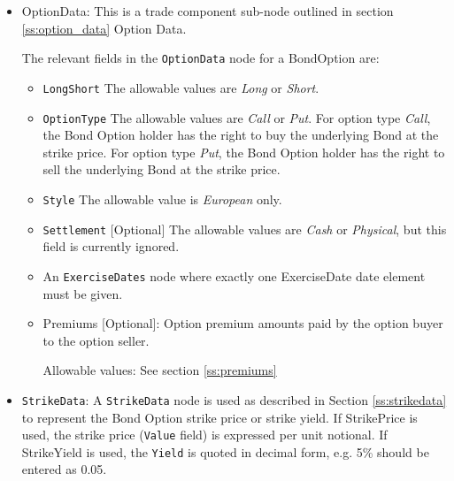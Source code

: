 \begin{itemize}
    \item OptionData: This is a trade component sub-node outlined in section \ref{ss:option_data} Option Data. 
    
The relevant fields in the \lstinline!OptionData! node for a BondOption are:

\begin{itemize}
\item \lstinline!LongShort! The allowable values are \emph{Long} or \emph{Short}.

\item \lstinline!OptionType! The allowable values are \emph{Call} or \emph{Put}. For option type \emph{Call}, the Bond Option holder has the right to buy the underlying Bond at the strike price. For option type \emph{Put}, the Bond Option holder has the right to sell the underlying Bond at the strike price. 
\item  \lstinline!Style! The allowable value is \emph{European} only.

\item  \lstinline!Settlement! [Optional] The allowable values are \emph{Cash} or \emph{Physical}, but this field is currently ignored.

\item An \lstinline!ExerciseDates! node where exactly one ExerciseDate date element must be given. \\

\item Premiums [Optional]: Option premium amounts paid by the option buyer to the option seller.

Allowable values:  See section \ref{ss:premiums}

\end{itemize}
    
    
    
    \item \lstinline!StrikeData!: A \lstinline!StrikeData! node is used as described in Section \ref{ss:strikedata} to represent the Bond Option strike price or strike yield. If StrikePrice is used, the strike price (\lstinline!Value! field) is expressed per unit notional.  If StrikeYield is used, the \lstinline!Yield! is quoted in decimal form, e.g. 5\% should be entered as 0.05.   
    

\end{itemize}

